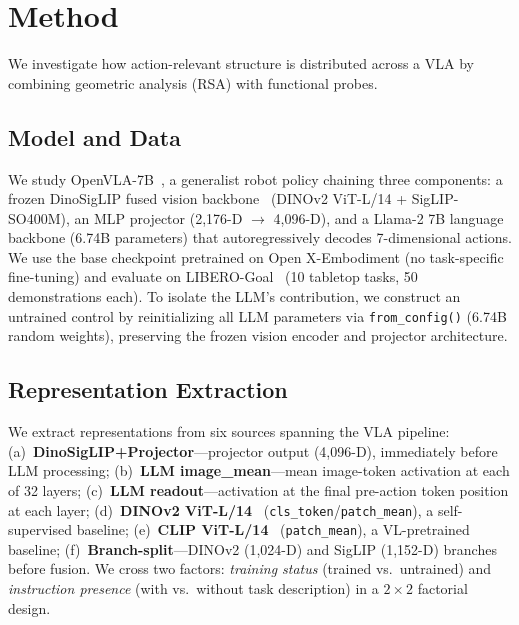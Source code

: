 \section{Method}
\label{sec:method}

We investigate how action-relevant structure is distributed across a VLA by combining geometric analysis (RSA) with functional probes.

\subsection{Model and Data}
\label{sec:model_data}

We study OpenVLA-7B~\cite{kim2024_openvla,karamcheti2024}, a generalist robot policy chaining three components: a frozen DinoSigLIP fused vision backbone~\cite{zhai2023_siglip,oquab2024_dinov2} (DINOv2 ViT-L/14 + SigLIP-SO400M), an MLP projector (2{,}176-D $\to$ 4{,}096-D), and a Llama-2 7B language backbone (6.74B parameters) that autoregressively decodes 7-dimensional actions.
We use the base checkpoint pretrained on Open X-Embodiment (no task-specific fine-tuning) and evaluate on LIBERO-Goal~\cite{liu2023_libero} (10 tabletop tasks, 50 demonstrations each).
To isolate the LLM's contribution, we construct an untrained control by reinitializing all LLM parameters via \texttt{from\_config()} (6.74B random weights), preserving the frozen vision encoder and projector architecture.

\subsection{Representation Extraction}
\label{sec:repr_extraction}

We extract representations from six sources spanning the VLA pipeline:
(a)~\textbf{DinoSigLIP+Projector}---projector output (4{,}096-D), immediately before LLM processing;
(b)~\textbf{LLM image\_mean}---mean image-token activation at each of 32 layers;
(c)~\textbf{LLM readout}---activation at the final pre-action token position at each layer;
(d)~\textbf{DINOv2 ViT-L/14}~\cite{oquab2024_dinov2} (\texttt{cls\_token}/\texttt{patch\_mean}), a self-supervised baseline;
(e)~\textbf{CLIP ViT-L/14}~\cite{radford2021_clip} (\texttt{patch\_mean}), a VL-pretrained baseline;
(f)~\textbf{Branch-split}---DINOv2 (1{,}024-D) and SigLIP (1{,}152-D) branches before fusion.
We cross two factors: \emph{training status} (trained vs.\ untrained) and \emph{instruction presence} (with vs.\ without task description) in a $2\times 2$ factorial design.

